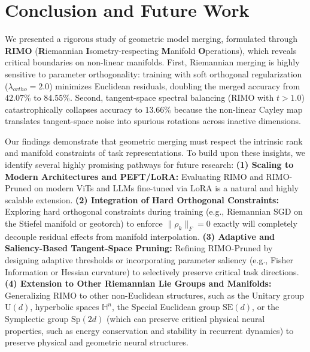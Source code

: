 \section{Conclusion and Future Work}
\label{sec:conclusion}

We presented a rigorous study of geometric model merging, formulated through \textbf{RIMO} (\textbf{R}iemannian \textbf{I}sometry-respecting \textbf{M}anifold \textbf{O}perations), which reveals critical boundaries on non-linear manifolds. First, Riemannian merging is highly sensitive to parameter orthogonality: training with soft orthogonal regularization ($\lambda_{ortho} = 2.0$) minimizes Euclidean residuals, doubling the merged accuracy from $42.07\%$ to $84.55\%$. Second, tangent-space spectral balancing (RIMO with $t > 1.0$) catastrophically collapses accuracy to $13.66\%$ because the non-linear Cayley map translates tangent-space noise into spurious rotations across inactive dimensions.

Our findings demonstrate that geometric merging must respect the intrinsic rank and manifold constraints of task representations. To build upon these insights, we identify several highly promising pathways for future research:
\textbf{(1) Scaling to Modern Architectures and PEFT/LoRA:} Evaluating RIMO and RIMO-Pruned on modern ViTs and LLMs fine-tuned via LoRA is a natural and highly scalable extension.
\textbf{(2) Integration of Hard Orthogonal Constraints:} Exploring hard orthogonal constraints during training (e.g., Riemannian SGD on the Stiefel manifold or geotorch) to enforce $\|\rho_k\|_F = 0$ exactly will completely decouple residual effects from manifold interpolation.
\textbf{(3) Adaptive and Saliency-Based Tangent-Space Pruning:} Refining RIMO-Pruned by designing adaptive thresholds or incorporating parameter saliency (e.g., Fisher Information or Hessian curvature) to selectively preserve critical task directions.
\textbf{(4) Extension to Other Riemannian Lie Groups and Manifolds:} Generalizing RIMO to other non-Euclidean structures, such as the Unitary group $\mathrm{U}(d)$, hyperbolic spaces $\mathbb{H}^n$, the Special Euclidean group $\mathrm{SE}(d)$, or the Symplectic group $\mathrm{Sp}(2d)$ (which can preserve critical physical neural properties, such as energy conservation and stability in recurrent dynamics) to preserve physical and geometric neural structures.

